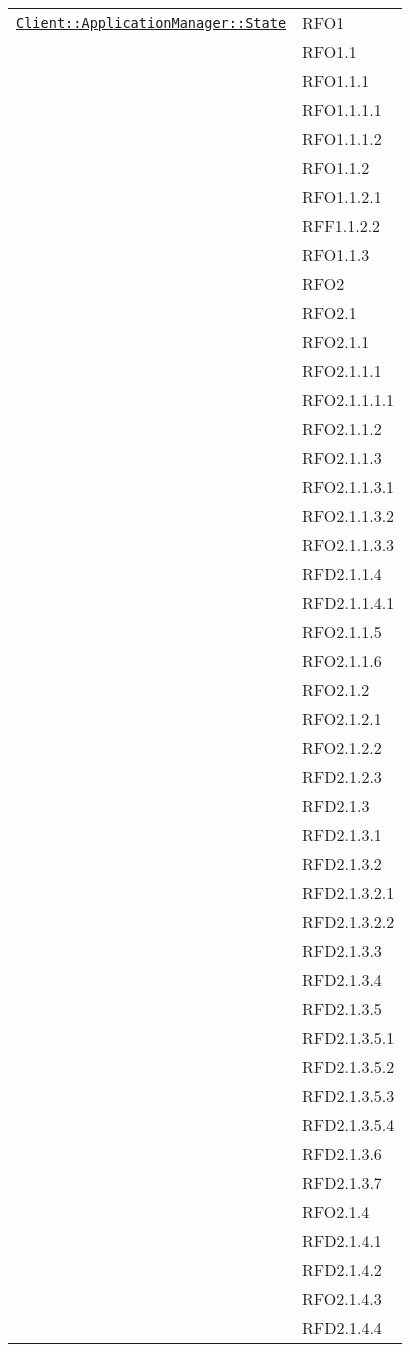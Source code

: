 \begin{longtable}{|>{\centering}m{10cm}|m{3cm}<{\centering}|}
\hyperref[Client::ApplicationManager::State]{\texttt{Client::ApplicationManager::State}} & RFO1\\
& RFO1.1\\
& RFO1.1.1\\
& RFO1.1.1.1\\
& RFO1.1.1.2\\
& RFO1.1.2\\
& RFO1.1.2.1\\
& RFF1.1.2.2\\
& RFO1.1.3\\
& RFO2\\
& RFO2.1\\
& RFO2.1.1\\
& RFO2.1.1.1\\
& RFO2.1.1.1.1\\
& RFO2.1.1.2\\
& RFO2.1.1.3\\
& RFO2.1.1.3.1\\
& RFO2.1.1.3.2\\
& RFO2.1.1.3.3\\
& RFD2.1.1.4\\
& RFD2.1.1.4.1\\
& RFO2.1.1.5\\
& RFO2.1.1.6\\
& RFO2.1.2\\
& RFO2.1.2.1\\
& RFO2.1.2.2\\
& RFD2.1.2.3\\
& RFD2.1.3\\
& RFD2.1.3.1\\
& RFD2.1.3.2\\
& RFD2.1.3.2.1\\
& RFD2.1.3.2.2\\
& RFD2.1.3.3\\
& RFD2.1.3.4\\
& RFD2.1.3.5\\
& RFD2.1.3.5.1\\
& RFD2.1.3.5.2\\
& RFD2.1.3.5.3\\
& RFD2.1.3.5.4\\
& RFD2.1.3.6\\
& RFD2.1.3.7\\
& RFO2.1.4\\
& RFD2.1.4.1\\
& RFD2.1.4.2\\
& RFO2.1.4.3\\
& RFD2.1.4.4\\

\end{longtable}
